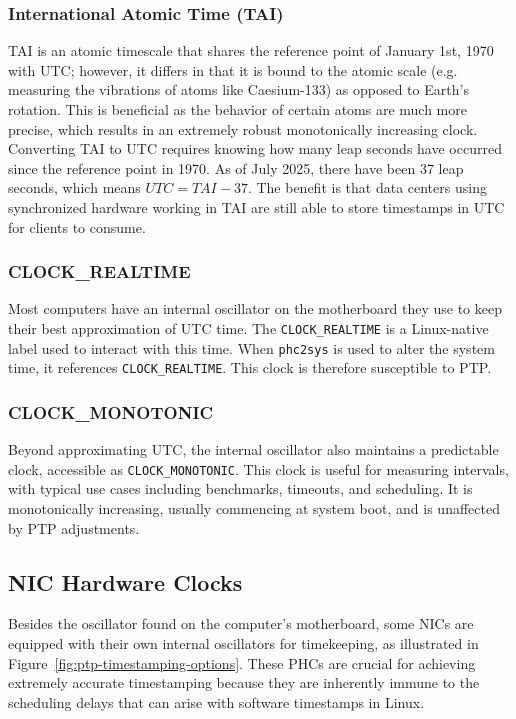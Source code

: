 \subsubsection{International Atomic Time (TAI)}
\label{subsubsec:tai}
\ac{TAI} is an atomic timescale that shares the reference point of January 1st, 1970 with \ac{UTC}; however, it differs in that it is bound to the atomic scale (e.g. measuring the vibrations of atoms like Caesium-133) as opposed to Earth's rotation. This is beneficial as the behavior of certain atoms are much more precise, which results in an extremely robust monotonically increasing clock. Converting \ac{TAI} to \ac{UTC} requires knowing how many leap seconds have occurred since the reference point in 1970. As of July 2025, there have been 37 leap seconds, which means $UTC = TAI - 37$. The benefit is that data centers using synchronized hardware working in \ac{TAI} are still able to store timestamps in \ac{UTC} for clients to consume.

\subsubsection{CLOCK\_REALTIME}
\label{subsubsec:clock-realtime}
Most computers have an internal oscillator on the motherboard they use to keep their best approximation of \ac{UTC} time. The \texttt{CLOCK\_REALTIME} is a Linux-native label used to interact with this time. When \texttt{phc2sys} is used to alter the system time, it references \texttt{CLOCK\_REALTIME}. This clock is therefore susceptible to \ac{PTP}.

\subsubsection{CLOCK\_MONOTONIC}
\label{subsubsec:clock-monotonic}
Beyond approximating \ac{UTC}, the internal oscillator also maintains a predictable clock, accessible as \texttt{CLOCK\_MONOTONIC}. This clock is useful for measuring intervals, with typical use cases including benchmarks, timeouts, and scheduling. It is monotonically increasing, usually commencing at system boot, and is unaffected by \ac{PTP} adjustments.

\subsection{NIC Hardware Clocks}
\label{subsec:nic-hw-clocks}
Besides the oscillator found on the computer's motherboard, some \ac{NIC}s are equipped with their own internal oscillators for timekeeping, as illustrated in Figure~\ref{fig:ptp-timestamping-options}. These \ac{PHC}s are crucial for achieving extremely accurate timestamping because they are inherently immune to the scheduling delays that can arise with software timestamps in Linux.

